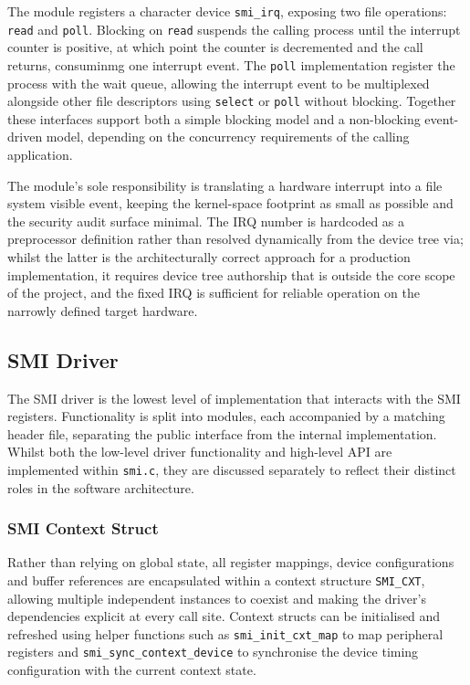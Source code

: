 \documentclass[final]{cmpreport}
\begin{document}
The module registers a character device \texttt{smi\_irq}, exposing two file operations: \texttt{read} and \texttt{poll}. Blocking on \texttt{read} suspends the calling process until the interrupt counter is positive, at which point the counter is decremented and the call returns, consuminmg one interrupt event. The \texttt{poll} implementation register the process with the wait queue, allowing the interrupt event to be multiplexed alongside other file descriptors using \texttt{select} or \texttt{poll} without blocking. Together these interfaces support both a simple blocking model and a non-blocking event-driven model, depending on the concurrency requirements of the calling application.

The module's sole responsibility is translating a hardware interrupt into a file system visible event, keeping the kernel-space footprint as small as possible and the security audit surface minimal. The IRQ number is hardcoded as a preprocessor definition rather than resolved dynamically from the device tree via; whilst the latter is the architecturally correct approach for a production implementation, it requires device tree authorship that is outside the core scope of the project, and the fixed IRQ is sufficient for reliable operation on the narrowly defined target hardware.

\subsection{SMI Driver}
The SMI driver is the lowest level of implementation that interacts with the SMI registers. Functionality is split into modules, each accompanied by a matching header file, separating the public interface from the internal implementation. Whilst both the low-level driver functionality and high-level API are implemented within \texttt{smi.c}, they are discussed separately to reflect their distinct roles in the software architecture.

\subsubsection{SMI Context Struct}
Rather than relying on global state, all register mappings, device configurations and buffer references are encapsulated within a context structure \texttt{SMI\_CXT}, allowing multiple independent instances to coexist and making the driver's dependencies explicit at every call site. Context structs can be initialised and refreshed using helper functions such as \texttt{smi\_init\_\-cxt\_\-map} to map peripheral registers and \texttt{smi\_sync\_\-context\_\-device} to synchronise the device timing configuration with the current context state.
\end{document}
